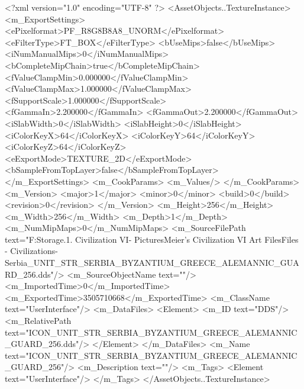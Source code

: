 <?xml version="1.0" encoding="UTF-8" ?>
<AssetObjects..TextureInstance>
	<m_ExportSettings>
		<ePixelformat>PF_R8G8B8A8_UNORM</ePixelformat>
		<eFilterType>FT_BOX</eFilterType>
		<bUseMips>false</bUseMips>
		<iNumManualMips>0</iNumManualMips>
		<bCompleteMipChain>true</bCompleteMipChain>
		<fValueClampMin>0.000000</fValueClampMin>
		<fValueClampMax>1.000000</fValueClampMax>
		<fSupportScale>1.000000</fSupportScale>
		<fGammaIn>2.200000</fGammaIn>
		<fGammaOut>2.200000</fGammaOut>
		<iSlabWidth>0</iSlabWidth>
		<iSlabHeight>0</iSlabHeight>
		<iColorKeyX>64</iColorKeyX>
		<iColorKeyY>64</iColorKeyY>
		<iColorKeyZ>64</iColorKeyZ>
		<eExportMode>TEXTURE_2D</eExportMode>
		<bSampleFromTopLayer>false</bSampleFromTopLayer>
	</m_ExportSettings>
	<m_CookParams>
		<m_Values/>
	</m_CookParams>
	<m_Version>
		<major>1</major>
		<minor>0</minor>
		<build>0</build>
		<revision>0</revision>
	</m_Version>
	<m_Height>256</m_Height>
	<m_Width>256</m_Width>
	<m_Depth>1</m_Depth>
	<m_NumMipMaps>0</m_NumMipMaps>
	<m_SourceFilePath text="F:\Mod Storage\2.1. Civilization VI\Mods\Archive - Pictures\Sid Meier's Civilization VI Art Files\Art Files - Civilizations\Civilization - Serbia\ICON_UNIT_STR_SERBIA_BYZANTIUM_GREECE_ALEMANNIC_GUARD_256.dds"/>
	<m_SourceObjectName text=""/>
	<m_ImportedTime>0</m_ImportedTime>
	<m_ExportedTime>3505710668</m_ExportedTime>
	<m_ClassName text="UserInterface"/>
	<m_DataFiles>
		<Element>
			<m_ID text="DDS"/>
			<m_RelativePath text="ICON_UNIT_STR_SERBIA_BYZANTIUM_GREECE_ALEMANNIC_GUARD_256.dds"/>
		</Element>
	</m_DataFiles>
	<m_Name text="ICON_UNIT_STR_SERBIA_BYZANTIUM_GREECE_ALEMANNIC_GUARD_256"/>
	<m_Description text=""/>
	<m_Tags>
		<Element text="UserInterface"/>
	</m_Tags>
</AssetObjects..TextureInstance>

